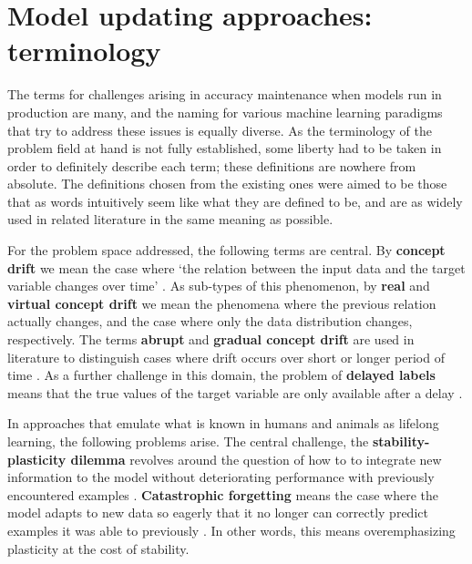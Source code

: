 
\section{Model updating approaches: terminology}


The terms for challenges arising in accuracy maintenance when models run in production are many, and the naming for various machine learning paradigms that try to address these issues is equally diverse. As the terminology of the problem field at hand is not fully established, some liberty had to be taken in order to definitely describe each term; these definitions are nowhere from absolute. The definitions chosen from the existing ones were aimed to be those that as words intuitively seem like what they are defined to be, and are as widely used in related literature in the same meaning as possible. 

For the problem space addressed, the following terms are central. By \textbf{concept drift} we mean the case where `the relation between the input
data and the target variable changes over time' \cite{conceptdriftsurvey}. As sub-types of this phenomenon, by \textbf{real} and \textbf{virtual concept drift} we mean the phenomena where the previous relation actually changes, and the case where only the data distribution changes, respectively. The terms \textbf{abrupt} and \textbf{gradual concept drift} are used in literature to distinguish cases where drift occurs over short or longer period of time \cite{zliobaite_driftsurvey}. As a further challenge in this domain, the problem of \textbf{delayed labels} means that the true values of the target variable are only available after a delay \cite{delayedlabelstreams}.

In approaches that emulate what is known in humans and animals as lifelong learning, the following problems arise. The central challenge, the \textbf{stability-plasticity dilemma} revolves around the question of how to to integrate new information to the model without deteriorating performance with previously encountered examples \cite{lmlinneuralnets}. \textbf{Catastrophic forgetting} means the case where the model adapts to new data so eagerly that it no longer can correctly predict examples it was able to previously \cite{lmlinneuralnets}. In other words, this means overemphasizing plasticity at the cost of stability.

